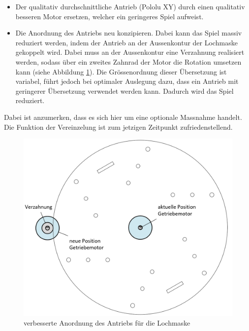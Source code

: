 \begin{itemize}
	\item Der qualitativ durchschnittliche Antrieb (Pololu XY) durch einen qualitativ besseren Motor ersetzen, welcher ein geringeres Spiel aufweist.
	
	\item Die Anordnung des Antriebs neu konzipieren. Dabei kann das Spiel massiv reduziert werden, indem der Antrieb an der Aussenkontur der Lochmaske gekoppelt wird. Dabei muss an der Aussenkontur eine Verzahnung realisiert werden, sodass über ein zweites Zahnrad der Motor die Rotation umsetzen kann (siehe Abbildung \ref{fig:optimierung_lochmaske}). Die Grössenordnung dieser Übersetzung ist variabel, führt jedoch bei optimaler Auslegung dazu, dass ein Antrieb mit geringerer Übersetzung verwendet werden kann. Dadurch wird das Spiel reduziert. 
\end{itemize}
Dabei ist anzumerken, dass es sich hier um eine optionale Massnahme handelt. Die Funktion der Vereinzelung ist zum jetzigen Zeitpunkt zufriedenstellend.
\begin{figure}[H]
	\includegraphics[scale=0.5]{Illustrationen/8-Fazit/optimierung_lochmaske.png}
	\caption{verbesserte Anordnung des Antriebs für die Lochmaske}
	\label{fig:optimierung_lochmaske}
\end{figure}